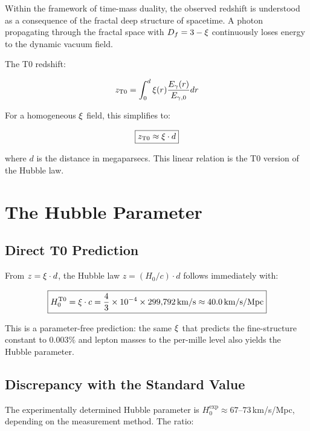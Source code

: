 Within the framework of time-mass duality, the observed redshift is 
understood as a consequence of the fractal deep structure of spacetime. A 
photon propagating through the fractal space with $D_f = 3 - \xi$ 
continuously loses energy to the dynamic vacuum field.

The T0 redshift:

\begin{equation}
z_{\text{T0}} = \int_0^d \xi(r) \frac{E_\gamma(r)}{E_{\gamma,0}} dr
\end{equation}

For a homogeneous $\xi$ field, this simplifies to:

\begin{equation}
\boxed{z_{\text{T0}} \approx \xi \cdot d}
\label{eq:z_T0_linear}
\end{equation}

where $d$ is the distance in megaparsecs. This linear relation is the 
T0 version of the Hubble law.

\section{The Hubble Parameter}

\subsection{Direct T0 Prediction}

From $z = \xi \cdot d$, the Hubble law $z = (H_0/c) \cdot d$ follows 
immediately with:

\begin{equation}
\boxed{H_0^{\text{T0}} = \xi \cdot c = \frac{4}{3} \times 10^{-4} \times 299{,}792\,\text{km/s} \approx 40.0\,\text{km/s/Mpc}}
\label{eq:H0_T0}
\end{equation}

This is a parameter-free prediction: the same $\xi$ that predicts the 
fine-structure constant to $0.003\%$ and lepton masses to the per-mille level 
also yields the Hubble parameter.

\subsection{Discrepancy with the Standard Value}

The experimentally determined Hubble parameter is $H_0^{\text{exp}} \approx 
67$--$73\,$km/s/Mpc, depending on the measurement method. The ratio:


